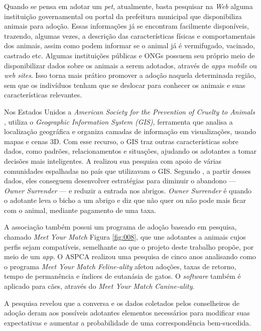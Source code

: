 \documentclass[portuguese]{textolivre}
\begin{document}
Quando se pensa em adotar um \textit{pet}, atualmente, basta pesquisar na \textit{Web} alguma instituição governamental ou portal da prefeitura municipal que disponibiliza animais para adoção. Essas informações já se encontram facilmente disponíveis, trazendo, algumas vezes, a descrição das características físicas e comportamentais dos animais, assim como podem informar se o animal já é vermifugado, vacinado, castrado etc. Algumas instituições públicas e ONGs possuem seu próprio meio de disponibilizar dados sobre os animais a serem adotados, através de \textit{apps} \textit{mobile} ou \textit{web sites}. Isso torna mais prático promover a adoção naquela determinada região, sem que os indivíduos tenham que se deslocar para conhecer os animais e suas características relevantes.

Nos Estados Unidos a \textit{American Society for the Prevention of Cruelty to Animals} \cite{MYM:2017}, utiliza o \textit{Geographic Information System (GIS)}, ferramenta que analisa a localização geográfica e organiza camadas de informação em visualizações, usando mapas e cenas 3D. Com esse recurso, o GIS traz outras características sobre dados, como padrões, relacionamentos e situações, ajudando os adotantes a tomar decisões mais inteligentes. A \textcite{MYM:2017} realizou sua pesquisa com apoio de várias comunidades espalhadas no país que utilizavam o GIS. Segundo \textcite{Nahra}, a partir desses dados, eles conseguem desenvolver estratégias para diminuir o abandono — \textit{Owner Surrender} — e reduzir a entrada nos abrigos. \textit{Owner Surrender} é quando o adotante leva o bicho a um abrigo e diz que não quer ou não pode mais ficar com o animal, mediante pagamento de uma taxa.

A associação também possui um programa de adoção baseado em pesquisa, chamado \textit{Meet Your Match} Figura \ref{fig:008}, que une adotantes a animais cujos perfis sejam compatíveis, semelhante ao que o projeto deste trabalho propõe, por meio de um \textit{app}. O ASPCA realizou uma pesquisa de cinco anos analisando como o programa \textit{Meet Your Match Feline-ality} afetou adoções, taxas de retorno, tempo de permanência e índices de eutanásia de gatos. O \textit{software} também é aplicado para cães, através do \textit{Meet Your Match Canine-ality}.

A pesquisa revelou que a conversa e os dados coletados pelos conselheiros de adoção deram aos possíveis adotantes elementos necessários para modificar suas expectativas e aumentar a probabilidade de uma correspondência bem-sucedida.
\end{document}
